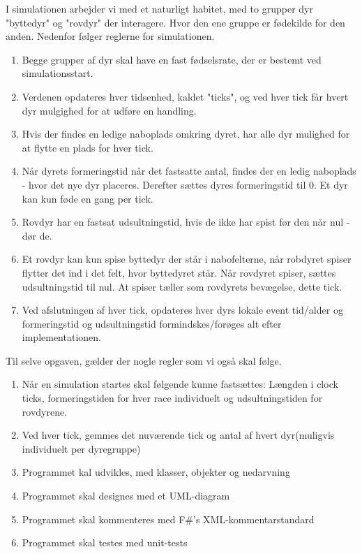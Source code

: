 \documentclass[a4paper]{article}
\begin{document}
    I simulationen arbejder vi med et naturligt habitet,
    med to grupper dyr "byttedyr" og "rovdyr" der interagere.
    Hvor den ene gruppe er fødekilde for den anden.
    Nedenfor følger reglerne for simulationen.

    \begin{enumerate}
      \item Begge grupper af dyr skal have en fast fødselsrate, der er bestemt ved simulationsstart.
      \item Verdenen opdateres hver tidsenhed, kaldet "ticks", og ved hver tick får hvert dyr mulgighed for at udføre en handling.
      \item Hvis der findes en ledige naboplads omkring dyret, har alle dyr mulighed for at flytte en plads for hver tick.
      \item Når dyrets formeringstid når det fastsatte antal, findes der en ledig naboplads - hvor det nye dyr placeres. Derefter sættes dyres formeringstid til 0. Et dyr kan kun føde en gang per tick.
      \item Rovdyr har en fastsat udsultningstid, hvis de ikke har spist før den når nul - dør de.
      \item Et rovdyr kan kun spise byttedyr der står i nabofelterne, når robdyret spiser flytter det ind i det felt, hvor byttedyret står. Når rovdyret spiser, sættes udsultningstid til nul. At spiser tæller som rovdyrets bevægelse, dette tick.
      \item Ved afslutningen af hver tick, opdateres hver dyrs lokale event tid/alder og formeringstid og udsultningstid formindskes/forøges alt efter implementationen.
    \end{enumerate}
    
    Til selve opgaven, gælder der nogle regler som vi også skal følge.
    \begin{enumerate}[label=item:programDeamnds]
      \item Når en simulation startes skal følgende kunne fastsættes: Længden i clock ticks, formeringstiden for hver race individuelt og udsultningstiden for rovdyrene.
      \item Ved hver tick, gemmes det nuværende tick og antal af hvert dyr(muligvis individuelt per dyregruppe)
      \item Programmet kal udvikles, med klasser, objekter og nedarvning
      \item Programmet skal designes med et UML-diagram
      \item Programmet skal kommenteres med F\#'s XML-kommentarstandard
      \item Programmet skal testes med unit-tests
    \end{enumerate}
\end{document}
